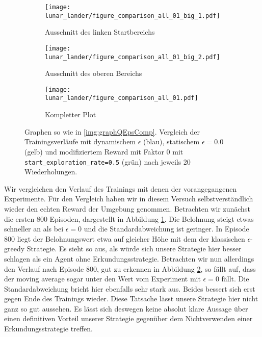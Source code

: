 \begin{figure}[h!]
    \centering
    \begin{subfigure}[b]{0.49\textwidth}
        \texttt{[image: lunar\_lander/figure\_comparison\_all\_01\_big\_1.pdf]}
        \caption{Ausschnitt des linken Startbereichs}
        \label{img:lunarComparisonAll01Big1}
    \end{subfigure}
    \begin{subfigure}[b]{0.49\textwidth}
        \texttt{[image: lunar\_lander/figure\_comparison\_all\_01\_big\_2.pdf]}
        \caption{Ausschnitt des oberen Bereichs}
        \label{img:lunarComparisonAll01Big2}
    \end{subfigure}
    \begin{subfigure}[b]{0.7\textwidth}
        \texttt{[image: lunar\_lander/figure\_comparison\_all\_01.pdf]}
        \caption{Kompletter Plot}
        \label{img:lunarComparisonAll01}
    \end{subfigure}
    \caption{Graphen so wie in \ref{img:graphQEpsComp}. Vergleich der Trainingsverläufe mit dynamischem $ \epsilon $ (blau), statischem $ \epsilon = 0.0 $ (gelb) und modifiziertem Reward mit Faktor 0 mit \texttt{start_exploration_rate=0.5} (grün) nach jeweils 20 Wiederholungen.}
    \label{img:lunarComparisonAll01All}
\end{figure}

Wir vergleichen den Verlauf des Trainings mit denen der vorangegangenen Experimente. Für den Vergleich haben wir in diesem Versuch selbstverständlich wieder den echten Reward der Umgebung genommen. Betrachten wir zunächst die ersten 800 Episoden, dargestellt in Abbildung \ref{img:lunarComparisonAll01Big1}. Die Belohnung steigt etwas schneller an als bei $ \epsilon = 0 $ und die Standardabweichung ist geringer. In Episode 800 liegt der Belohnungswert etwa auf gleicher Höhe mit dem der klassischen $ \epsilon $-greedy Strategie. Es sieht so aus, als würde sich unsere Strategie hier besser schlagen als ein Agent ohne Erkundungsstrategie. Betrachten wir nun allerdings den Verlauf nach Episode 800, gut zu erkennen in Abbildung \ref{img:lunarComparisonAll01Big2}, so fällt auf, dass der moving average sogar unter den Wert vom Experiment mit $ \epsilon = 0 $ fällt. Die Standardabweichung bricht hier ebenfalls sehr stark aus. Beides bessert sich erst gegen Ende des Trainings wieder. Diese Tatsache lässt unsere Strategie hier nicht ganz so gut aussehen. Es lässt sich deswegen keine absolut klare Aussage über einen definitiven Vorteil unserer Strategie gegenüber dem Nichtverwenden einer Erkundungsstrategie treffen.

